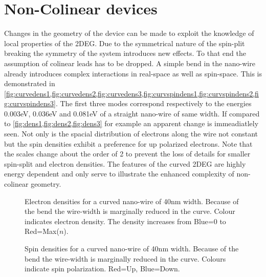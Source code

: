 \section{Non-Colinear devices}
Changes in the geometry of the device can be made to exploit the knowledge of local properties of the 2DEG. Due to the symmetrical nature of the spin-plit breaking the symmetry of the system introduces new effects. To that end the assumption of colinear leads has to be dropped. A simple bend in the nano-wire already introduces complex interactions in real-space as well as spin-space. This is demonstrated in \cref{fig:curvedens1,fig:curvedens2,fig:curvedens3,fig:curvspindens1,fig:curvspindens2,fig:curvspindens3}. The first three modes correspond respectively to the energies 0.003eV, 0.036eV and 0.081eV of a straight nano-wire of same width. If compared to \cref{fig:dens1,fig:dens2,fig:dens3} for example an apparent change is immeadiatlely seen. Not only is the spacial distribution of electrons along the wire not constant but the spin densities exhibit a preference for up polarized electrons. Note that the scales change about the order of 2 to prevent the loss of details for smaller spin-split and electron densities. The features of the curved 2DEG are highly energy dependent and only serve to illustrate the enhanced complexity of non-colinear geometry.
\begin{figure}[h!]
\caption{Electron densities for a curved nano-wire of 40nm width. Because of the bend the wire-width is marginally reduced in the curve. Colour indicates electron density. The density increases from Blue=0 to Red=Max($n$).}
\end{figure}
\begin{figure}[h!]
\caption{Spin densities for a curved nano-wire of 40nm width. Because of the bend the wire-width is marginally reduced in the curve. Colours indicate spin polarization. Red=Up, Blue=Down.}
\end{figure}
